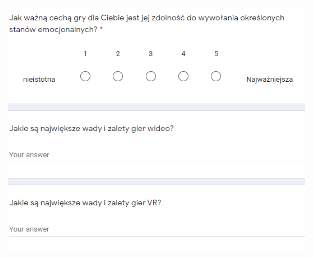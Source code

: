 \begin{figure}
	\centering
	\includegraphics[width=0.7\textwidth]{images/ankieta123456.PNG}
\end{figure}
